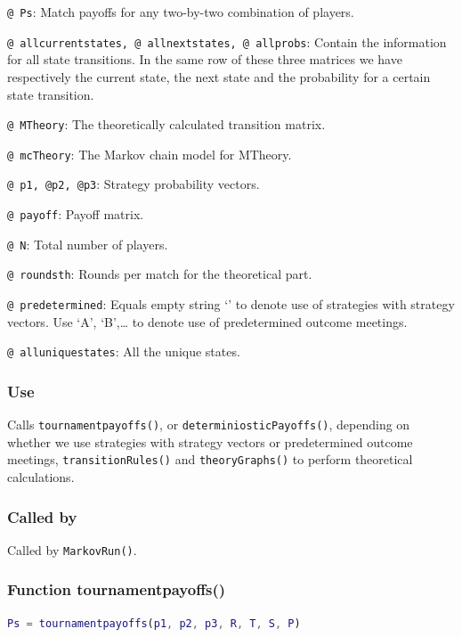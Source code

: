 \documentclass[12pt]{report}
\begin{document}
\texttt{@ Ps}: Match payoffs for any two-by-two combination of players.

\texttt{@ allcurrentstates, @ allnextstates, @ allprobs}: Contain the information for all state transitions. In the same row of these three matrices we have respectively the current state, the next state and the probability for a certain state transition.

\texttt{@ MTheory}: The theoretically calculated transition matrix.

\texttt{@ mcTheory}: The Markov chain model for MTheory.

\texttt{@ p1, @p2, @p3}: Strategy probability vectors.

\texttt{@ payoff}: Payoff matrix.

\texttt{@ N}: Total number of players.

\texttt{@ roundsth}: Rounds per match for the theoretical part.

\texttt{@ predetermined}: Equals empty string ‘’ to denote use of strategies with strategy vectors. Use ‘A’, ‘B',… to denote use of predetermined outcome meetings.

\texttt{@ alluniquestates}: All the unique states.

\subsubsection*{Use}
Calls \texttt{tournamentpayoffs()}, or \texttt{determiniosticPayoffs()}, depending on whether we use strategies with strategy vectors or predetermined outcome meetings, \texttt{transitionRules()} and \texttt{theoryGraphs()} to perform theoretical calculations. 

\subsubsection*{Called by}
Called by \texttt{MarkovRun()}.







\subsubsection*{Function tournamentpayoffs()}

\begin{lstlisting}[language=Matlab]
Ps = tournamentpayoffs(p1, p2, p3, R, T, S, P)

\end{lstlisting}
\end{document}
